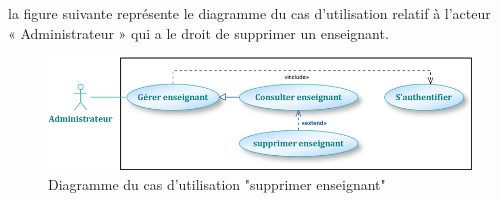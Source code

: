 \documentclass[12 pt]{report}
\begin{document}
la figure suivante représente le diagramme du cas d’utilisation  relatif à l’acteur \\« Administrateur » qui a le droit de supprimer un enseignant.
\begin{figure}[h]
 \begin{center}
\includegraphics[width=13 cm ,height= 4 cm]{a8.PNG}
\caption{Diagramme du cas d’utilisation "supprimer enseignant"}
\end{center}
\end{figure}
\end{document}
